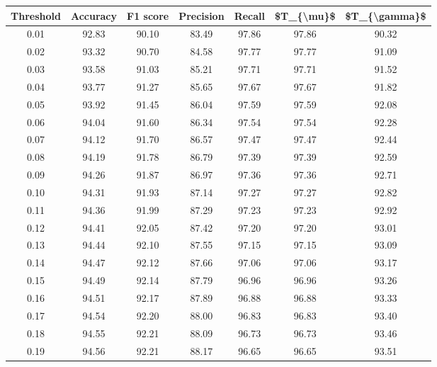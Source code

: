 \begin{tabular}{|c|c|c|c|c|c|c|}
\hline
 Threshold &  Accuracy &  F1 score &  Precision &  Recall &  \$T\_\{\textbackslash mu\}\$ &  \$T\_\{\textbackslash gamma\}\$ \\
\hline
      0.01 &     92.83 &     90.10 &      83.49 &   97.86 &      97.86 &         90.32 \\
      0.02 &     93.32 &     90.70 &      84.58 &   97.77 &      97.77 &         91.09 \\
      0.03 &     93.58 &     91.03 &      85.21 &   97.71 &      97.71 &         91.52 \\
      0.04 &     93.77 &     91.27 &      85.65 &   97.67 &      97.67 &         91.82 \\
      0.05 &     93.92 &     91.45 &      86.04 &   97.59 &      97.59 &         92.08 \\
      0.06 &     94.04 &     91.60 &      86.34 &   97.54 &      97.54 &         92.28 \\
      0.07 &     94.12 &     91.70 &      86.57 &   97.47 &      97.47 &         92.44 \\
      0.08 &     94.19 &     91.78 &      86.79 &   97.39 &      97.39 &         92.59 \\
      0.09 &     94.26 &     91.87 &      86.97 &   97.36 &      97.36 &         92.71 \\
      0.10 &     94.31 &     91.93 &      87.14 &   97.27 &      97.27 &         92.82 \\
      0.11 &     94.36 &     91.99 &      87.29 &   97.23 &      97.23 &         92.92 \\
      0.12 &     94.41 &     92.05 &      87.42 &   97.20 &      97.20 &         93.01 \\
      0.13 &     94.44 &     92.10 &      87.55 &   97.15 &      97.15 &         93.09 \\
      0.14 &     94.47 &     92.12 &      87.66 &   97.06 &      97.06 &         93.17 \\
      0.15 &     94.49 &     92.14 &      87.79 &   96.96 &      96.96 &         93.26 \\
      0.16 &     94.51 &     92.17 &      87.89 &   96.88 &      96.88 &         93.33 \\
      0.17 &     94.54 &     92.20 &      88.00 &   96.83 &      96.83 &         93.40 \\
      0.18 &     94.55 &     92.21 &      88.09 &   96.73 &      96.73 &         93.46 \\
      0.19 &     94.56 &     92.21 &      88.17 &   96.65 &      96.65 &         93.51 \\

\end{tabular}
